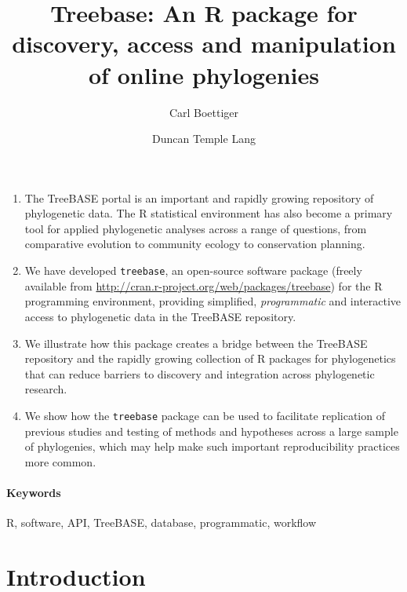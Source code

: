 \documentclass[author-year, 8pt, 3p]{elsarticle} %
\begin{document}
\begin{frontmatter}
  \title{Treebase: An R package for discovery, access and manipulation of online
         phylogenies}
  \author[cpb]{Carl Boettiger}
  \address[cpb]{Center for Population Biology, University of California, Davis, California 95616}
  \author[stats]{Duncan Temple Lang}
  \address[stats]{Department of Statistics, University of California, Davis, California 95616}
 \end{frontmatter}


\begin{enumerate}[1.]
\item
  The TreeBASE portal is an important and rapidly growing repository of
  phylogenetic data. The R statistical environment has also become a
  primary tool for applied phylogenetic analyses across a range of
  questions, from comparative evolution to community ecology to
  conservation planning.
\item
  We have developed \texttt{treebase}, an open-source software package
  (freely available from
  \href{http://cran.r-project.org/web/packages/treebase}{http://cran.r-project.org/web/packages/treebase})
  for the R programming environment, providing simplified,
  \emph{programmatic} and interactive access to phylogenetic data in the
  TreeBASE repository.
\item
  We illustrate how this package creates a bridge between the TreeBASE
  repository and the rapidly growing collection of R packages for
  phylogenetics that can reduce barriers to discovery and integration
  across phylogenetic research.
\item
  We show how the \texttt{treebase} package can be used to facilitate
  replication of previous studies and testing of methods and hypotheses
  across a large sample of phylogenies, which may help make such
  important reproducibility practices more common.
\end{enumerate}
\paragraph{Keywords}

R, software, API, TreeBASE, database, programmatic, workflow

\section{Introduction}
\end{document}
